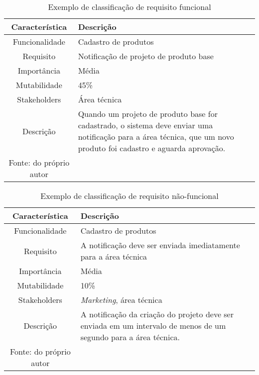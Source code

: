       \begin{table}[h!]
        \centering
        \label{Tabela:5}
        \caption{Exemplo de classificação de requisito funcional}
        \begin{tabular}{c p{9cm}}
          \hline
          \textbf{Característica} &
          \textbf{Descrição} \\
          \hline
          Funcionalidade &
          Cadastro de produtos \\
          Requisito &
          Notificação de projeto de produto base \\
          Importância &
          Média \\
          Mutabilidade &
          45\% \\
          Stakeholders &
          Área técnica \\
          Descrição &
          Quando um projeto de produto base for cadastrado, o sistema deve
          enviar uma notificação para a área técnica, que um novo produto
          foi cadastro e aguarda aprovação. \\ \hline
          \newline
          \small{Fonte: do próprio autor}
        \end{tabular}
      \end{table}

      \begin{table}[h!]
        \centering
        \label{Tabela:6}
        \caption{Exemplo de classificação de requisito não-funcional}
        \begin{tabular}{c p{9cm}}
          \hline
          \textbf{Característica} &
          \textbf{Descrição} \\
          \hline
          Funcionalidade &
          Cadastro de produtos \\
          Requisito &
          A notificação deve ser enviada imediatamente para a área técnica \\
          Importância &
          Média \\
          Mutabilidade &
          10\% \\
          Stakeholders &
          \textit{Marketing}, área técnica \\
          Descrição &
          A notificação da criação do projeto deve ser enviada em um intervalo de
          menos de um segundo para a área técnica. \\ \hline
          \newline
          \small{Fonte: do próprio autor}
        \end{tabular}
      \end{table}

